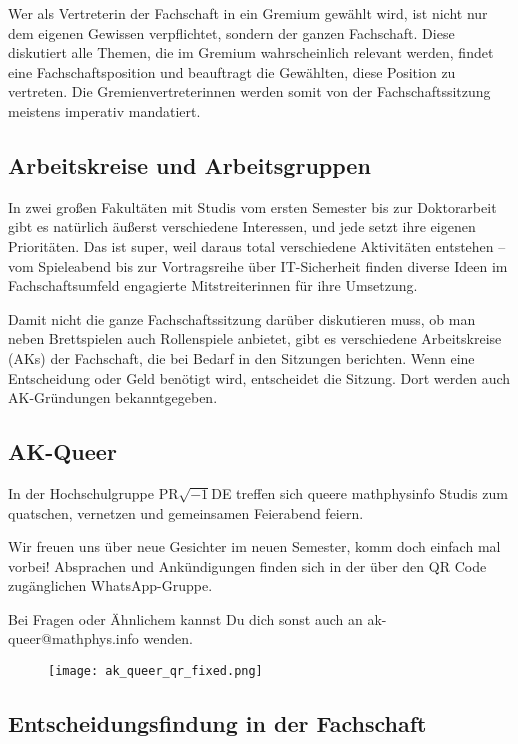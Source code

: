 Wer als Vertreterin der Fachschaft in ein Gremium gewählt wird, ist nicht nur dem eigenen Gewissen verpflichtet, sondern der ganzen Fachschaft. Diese diskutiert alle Themen, die im Gremium wahrscheinlich relevant werden, findet eine Fachschaftsposition und beauftragt die Gewählten, diese Position zu vertreten. Die Gremienvertreterinnen werden somit von der Fachschaftssitzung meistens imperativ mandatiert.

\vspace*{-2mm}
\subsection{Arbeitskreise und Arbeitsgruppen}
In zwei großen Fakultäten mit Studis vom ersten Semester bis zur Doktorarbeit gibt es natürlich äußerst verschiedene Interessen, und jede setzt ihre eigenen Prioritäten. Das ist super, weil daraus total verschiedene Aktivitäten entstehen -- vom Spieleabend bis zur Vortragsreihe über IT-Sicherheit finden diverse Ideen im Fachschaftsumfeld engagierte Mitstreiterinnen für ihre Umsetzung.

Damit nicht die ganze Fachschaftssitzung darüber diskutieren muss, ob man neben Brettspielen auch Rollenspiele anbietet, gibt es verschiedene Arbeitskreise (AKs) der Fachschaft, die bei Bedarf in den Sitzungen berichten. Wenn eine Entscheidung oder Geld benötigt wird, entscheidet die Sitzung. Dort werden auch AK-Gründungen bekanntgegeben.

\vspace*{-2mm}
\subsection{AK-Queer}
In der Hochschulgruppe PR$\sqrt{-1}$DE treffen sich queere mathphysinfo Studis zum quatschen, vernetzen und gemeinsamen Feierabend feiern.

Wir freuen uns über neue Gesichter im neuen Semester, komm doch einfach mal vorbei! Absprachen und Ankündigungen finden sich in der über den QR Code zugänglichen WhatsApp-Gruppe.

Bei Fragen oder Ähnlichem kannst Du dich sonst auch an ak-queer@mathphys.info wenden.
\begin{figure}[h]
    \texttt{[image: ak\_queer\_qr\_fixed.png]}
\end{figure}

\vspace*{-2mm}
\subsection{Entscheidungsfindung in der Fachschaft}

